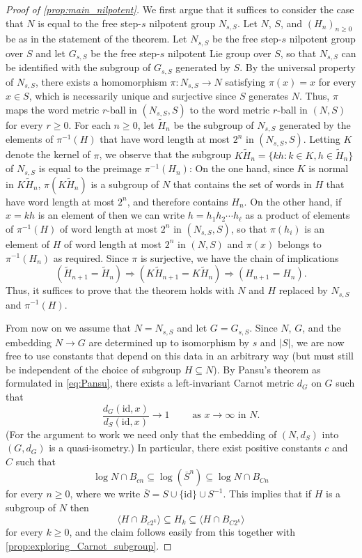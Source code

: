 \begin{proof}[Proof of \cref{prop:main_nilpotent}]
We first argue that it suffices to consider the case that $N$ is equal to the free step-$s$ nilpotent group $N_{s,S}$.
Let $N$, $S$, and $(H_n)_{n\geq 0}$ be as in the statement of the theorem. Let $N_{s,S}$ be the free step-$s$ nilpotent group over $S$ and let $G_{s,S}$ be the free step-$s$ nilpotent Lie group over $S$, so that $N_{s,S}$ can be identified with the subgroup of $G_{s,S}$ generated by $S$. By the universal property of $N_{s,S}$, there exists a homomorphism $\pi:N_{s,S}\to N$ satisfying $\pi(x)=x$ for every $x\in S$, which is necessarily unique and surjective since $S$ generates $N$. Thus, $\pi$ maps the word metric $r$-ball in $(N_{s,S},S)$ to the word metric $r$-ball in $(N,S)$ for every $r\geq 0$.
For each $n \geq 0$, let $\tilde H_n$ be the subgroup of $N_{s,S}$ generated by the elements of $\pi^{-1}(H)$ that have word length at most $2^n$ in $(N_{s,S},S)$. Letting $K$ denote the kernel of $\pi$, we observe that the subgroup $K\tilde H_n=\{kh:k\in K, h\in \tilde H_n\}$ of $N_{s,S}$ is equal to the preimage $\pi^{-1}(H_n)$: On the one hand, since $K$ is normal in $K \tilde H_n$, $\pi(K \tilde H_n)$ is a subgroup of $N$ that contains the set of words in $H$ that have word length at most $2^n$, and therefore contains $H_n$. On the other hand, if $x=kh$ is an element of then we can write $h=h_1 h_2\cdots h_\ell$ as a product of elements of $\pi^{-1}(H)$ of word length at most $2^n$ in $(N_{s,S},S)$, so that $\pi(h_i)$ is an element of $H$ of word length at most $2^n$ in $(N,S)$ and $\pi(x)$ belongs to $\pi^{-1}(H_n)$ as required. 
%
%
 Since $\pi$ is surjective, we have the chain of implications
 \[
(\tilde H_{n+1}=\tilde H_n) \Rightarrow (K \tilde H_{n+1}=K\tilde H_n) \Rightarrow (H_{n+1}=H_n).
 \]
 Thus, it suffices to prove that the theorem holds with $N$ and $H$ replaced by $N_{s,S}$ and $\pi^{-1}(H)$.

\medskip

From now on we assume that $N=N_{s,S}$ and let $G=G_{s,S}$. Since $N$, $G$, and the embedding $N\to G$ are determined up to isomorphism by $s$ and $|S|$, we are now free to use constants that depend on this data in an arbitrary way (but must still be independent of the choice of subgroup $H \subseteq N$). 
By Pansu's theorem as formulated in \eqref{eq:Pansu}, there exists a left-invariant Carnot metric $d_G$ on $G$ such that 
\[
\frac{d_G(\mathrm{id},x)}{d_S(\mathrm{id},x)} \to 1 \qquad \text{ as $x\to\infty$ in $N$.}
\]
(For the argument to work we need only that the embedding of $(N,d_S)$ into $(G,d_G)$ is a quasi-isometry.)
In particular, there exist positive constants $c$ and $C$ such that
\[
\log N \cap B_{cn} \subseteq \log (\overline{S}^n) \subseteq \log N \cap B_{Cn}
\]
for every $n\geq 0$, where we write $\overline{S}=S\cup\{\mathrm{id}\}\cup S^{-1}$. This implies that if $H$ is a subgroup of $N$ then
\[
\langle H \cap B_{c2^k} \rangle \subseteq H_k \subseteq \langle H \cap B_{C2^k} \rangle
\]
for every $k \geq 0$, and the claim follows easily from this together with \cref{prop:exploring_Carnot_subgroup}. \qedhere

\end{proof}
